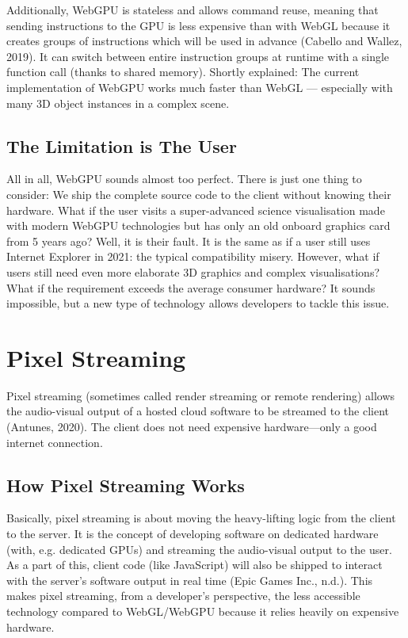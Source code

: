 \documentclass[10pt]{article}
\begin{document}
\begin{sloppypar}
  Additionally, WebGPU is stateless and allows command reuse, meaning that sending instructions to the GPU is less expensive than with WebGL because it creates groups of instructions which will be used in advance (Cabello and Wallez, 2019). It can switch between entire instruction groups at runtime with a single function call (thanks to shared memory). Shortly explained: The current implementation of WebGPU works much faster than WebGL — especially with many 3D object instances in a complex scene.

  \subsection{The Limitation is The User}
  \label{subsec:the-limitation-is-the-user}

  All in all, WebGPU sounds almost too perfect. There is just one thing to consider: We ship the complete source code to the client without knowing their hardware. What if the user visits a super-advanced science visualisation made with modern WebGPU technologies but has only an old onboard graphics card from 5 years ago? Well, it is their fault. It is the same as if a user still uses Internet Explorer in 2021: the typical compatibility misery. However, what if users still need even more elaborate 3D graphics and complex visualisations? What if the requirement exceeds the average consumer hardware? It sounds impossible, but a new type of technology allows developers to tackle this issue.

  \section{Pixel Streaming}
  \label{sec:pixel-streaming}

  Pixel streaming (sometimes called render streaming or remote rendering) allows the audio-visual output of a hosted cloud software to be streamed to the client (Antunes, 2020). The client does not need expensive hardware—only a good internet connection.

  \subsection{How Pixel Streaming Works}
  \label{subsec:how-pixel-streaming-works}

  Basically, pixel streaming is about moving the heavy-lifting logic from the client to the server. It is the concept of developing software on dedicated hardware (with, e.g. dedicated GPUs) and streaming the audio-visual output to the user. As a part of this, client code (like JavaScript) will also be shipped to interact with the server’s software output in real time (Epic Games Inc., n.d.). This makes pixel streaming, from a developer’s perspective, the less accessible technology compared to WebGL/WebGPU because it relies heavily on expensive hardware.


\end{sloppypar}
\end{document}

